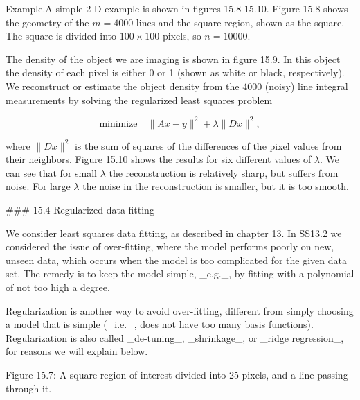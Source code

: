 Example.A simple 2-D example is shown in figures 15.8-15.10. Figure 15.8 shows the geometry of the \(m=4000\) lines and the square region, shown as the square. The square is divided into \(100\times 100\) pixels, so \(n=10000\).

The density of the object we are imaging is shown in figure 15.9. In this object the density of each pixel is either 0 or 1 (shown as white or black, respectively). We reconstruct or estimate the object density from the 4000 (noisy) line integral measurements by solving the regularized least squares problem

\[\text{minimize}\quad\|Ax-y\|^{2}+\lambda\|Dx\|^{2},\]

where \(\|Dx\|^{2}\) is the sum of squares of the differences of the pixel values from their neighbors. Figure 15.10 shows the results for six different values of \(\lambda\). We can see that for small \(\lambda\) the reconstruction is relatively sharp, but suffers from noise. For large \(\lambda\) the noise in the reconstruction is smaller, but it is too smooth.

### 15.4 Regularized data fitting

We consider least squares data fitting, as described in chapter 13. In SS13.2 we considered the issue of over-fitting, where the model performs poorly on new, unseen data, which occurs when the model is too complicated for the given data set. The remedy is to keep the model simple, _e.g._, by fitting with a polynomial of not too high a degree.

Regularization is another way to avoid over-fitting, different from simply choosing a model that is simple (_i.e._, does not have too many basis functions). Regularization is also called _de-tuning_, _shrinkage_, or _ridge regression_, for reasons we will explain below.

Figure 15.7: A square region of interest divided into 25 pixels, and a line passing through it.

 